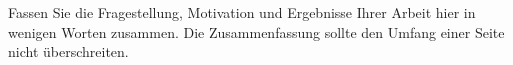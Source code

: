 Fassen Sie die Fragestellung, Motivation und Ergebnisse Ihrer Arbeit
hier in wenigen Worten zusammen. Die Zusammenfassung sollte den Umfang einer Seite nicht überschreiten.
